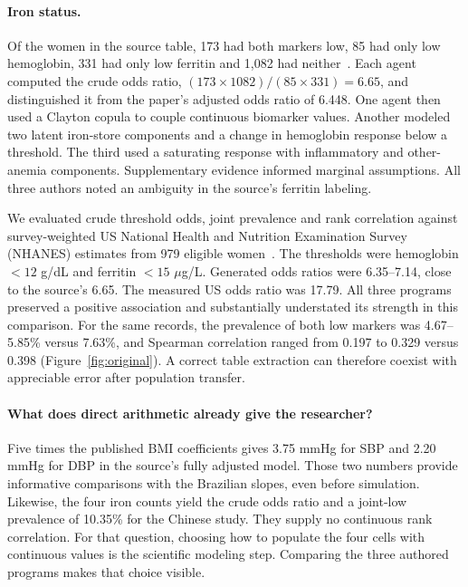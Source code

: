 \documentclass[sigconf,anonymous,review]{acmart}
\begin{document}
\paragraph{Iron status.}
Of the women in the source table, 173 had both markers low, 85 had only low hemoglobin, 331 had only low ferritin and 1,082 had neither~\cite{zhu}. Each agent computed the crude odds ratio, $(173\times1082)/(85\times331)=6.65$, and distinguished it from the paper's adjusted odds ratio of 6.448. One agent then used a Clayton copula to couple continuous biomarker values. Another modeled two latent iron-store components and a change in hemoglobin response below a threshold. The third used a saturating response with inflammatory and other-anemia components. Supplementary evidence informed marginal assumptions. All three authors noted an ambiguity in the source's ferritin labeling.

We evaluated crude threshold odds, joint prevalence and rank correlation against survey-weighted US National Health and Nutrition Examination Survey (NHANES) estimates from 979 eligible women~\cite{nhanes}. The thresholds were hemoglobin $<12$ g/dL and ferritin $<15$ $\mu$g/L. Generated odds ratios were 6.35--7.14, close to the source's 6.65. The measured US odds ratio was 17.79. All three programs preserved a positive association and substantially understated its strength in this comparison. For the same records, the prevalence of both low markers was 4.67--5.85\% versus 7.63\%, and Spearman correlation ranged from 0.197 to 0.329 versus 0.398 (Figure~\ref{fig:original}). A correct table extraction can therefore coexist with appreciable error after population transfer.

\paragraph{What does direct arithmetic already give the researcher?}
Five times the published BMI coefficients gives 3.75 mmHg for SBP and 2.20 mmHg for DBP in the source's fully adjusted model. Those two numbers provide informative comparisons with the Brazilian slopes, even before simulation. Likewise, the four iron counts yield the crude odds ratio and a joint-low prevalence of 10.35\% for the Chinese study. They supply no continuous rank correlation. For that question, choosing how to populate the four cells with continuous values is the scientific modeling step. Comparing the three authored programs makes that choice visible.
\end{document}
